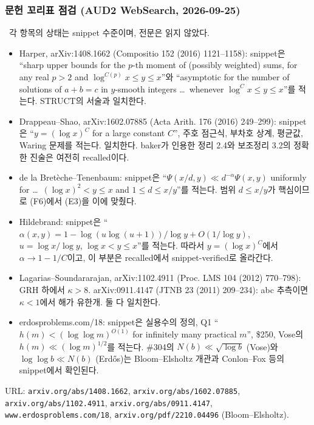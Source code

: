 \subsubsection{문헌 꼬리표 점검 (AUD2 WebSearch, 2026-09-25)}
\label{AUD2:lit}
\EXT\ 각 항목의 상태는 snippet 수준이며, 전문은 읽지 않았다.
\begin{itemize}
\item Harper, arXiv:1408.1662 (Compositio 152 (2016) 1121--1158): snippet은 ``sharp upper bounds for the $p$-th moment of (possibly weighted) sums, for any real $p>2$ and $\log^{C(p)}x\le y\le x$''와 ``asymptotic for the number of solutions of $a+b=c$ in $y$-smooth integers \ldots\ whenever $\log^Cx\le y\le x$''를 적는다. STRUCT의 서술과 일치한다.
\item Drappeau--Shao, arXiv:1602.07885 (Acta Arith. 176 (2016) 249--299): snippet은 ``$y=(\log x)^C$ for a large constant $C$'', 주호 점근식, 부차호 상계, 평균값, Waring 문제를 적는다. 일치한다. baker가 인용한 정리 2.4와 보조정리 3.2의 정확한 진술은 여전히 recalled이다.
\item de la Bretèche--Tenenbaum: snippet은 ``$\Psi(x/d,y)\ll d^{-\alpha}\Psi(x,y)$ uniformly for \ldots\ $(\log x)^2<y\le x$ and $1\le d\le x/y$''를 적는다. 범위 $d\le x/y$가 핵심이므로 (F6)에서 (E3)을 이에 맞췄다.
\item Hildebrand: snippet은 ``$\alpha(x,y)=1-\log(u\log(u+1))/\log y+O(1/\log y)$, $u=\log x/\log y$, $\log x<y\le x$''를 적는다. 따라서 $y=(\log x)^C$에서 $\alpha\to1-1/C$이고, 이 부분은 recalled에서 snippet-verified로 올라간다.
\item Lagarias--Soundararajan, arXiv:1102.4911 (Proc. LMS 104 (2012) 770--798): GRH 하에서 $\kappa>8$. arXiv:0911.4147 (JTNB 23 (2011) 209--234): abc 추측이면 $\kappa<1$에서 해가 유한개. 둘 다 일치한다.
\item erdosproblems.com/18: snippet은 실용수의 정의, Q1 ``$h(m)<(\log\log m)^{O(1)}$ for infinitely many practical $m$'', \$250, Vose의 $h(m)\ll(\log m)^{1/2}$를 적는다. \#304의 $N(b)\ll\sqrt{\log b}$ (Vose)와 $\log\log b\ll N(b)$ (Erdős)는 Bloom--Elsholtz 개관과 Conlon--Fox 등의 snippet에서 확인된다.
\end{itemize}
URL: \texttt{arxiv.org/abs/1408.1662}, \texttt{arxiv.org/abs/1602.07885}, \texttt{arxiv.org/abs/1102.4911}, \texttt{arxiv.org/abs/0911.4147}, \texttt{www.erdosproblems.com/18}, \texttt{arxiv.org/pdf/2210.04496} (Bloom--Elsholtz).

